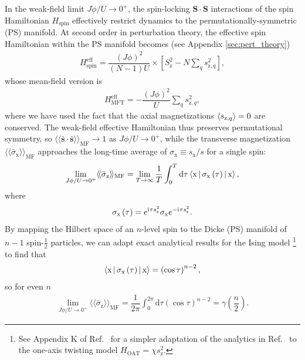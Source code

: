 \documentclass[nofootinbib,twocolumn]{revtex4-2}
\renewcommand{\t}{\text} %
\newcommand{\f}[2]{\dfrac{#1}{#2}} %
\newcommand{\p}[1]{\left(#1\right)} %
\renewcommand{\sp}[1]{\left[#1\right]} %
\newcommand{\bk}{\Braket} %
\renewcommand{\v}{\bm} %
\renewcommand{\c}{\cdot} %
\renewcommand{\dd}{\text{d}} %
\renewcommand{\i}{\mathrm{i}\mkern1mu} %
\newcommand{\bbk}[1]{\langle\!\langle #1 \rangle\!\rangle}
\newcommand{\1}{\mathds{1}}
\newcommand{\x}{\text{x}}
\newcommand{\z}{\text{z}}
\newcommand{\MF}{\text{MF}}
\renewcommand{\ss}{\bar{\v s}\c\bar{\v s}}
\begin{document}
In the weak-field limit $J\phi/U\to0^+$, the spin-locking $\v S\c\v S$ interactions of the spin Hamiltonian $H_{\t{spin}}$ effectively restrict dynamics to the permutationally-symmetric (PS) manifold.
At second order in perturbation theory, the effective spin Hamiltonian within the PS manifold becomes (see Appendix \ref{sec:pert_theory})
\begin{align}
  H_{\t{spin}}^{\t{eff}}
  = \f{\p{J\phi}^2}{\p{N-1}U}
  \times \sp{S_\z^2 - N\sum_q s_{\z,q}^2},
\end{align}
whose mean-field version is
\begin{align}
  H_{\t{MFT}}^{\t{eff}} = -\f{\p{J\phi}^2}{U} \sum_q s_{\z,q}^2,
\end{align}
where we have used the fact that the axial magnetizations $\bk{s_{\z,q}}=0$ are conserved.
The weak-field effective Hamiltonian thus preserves permutational symmetry, so $\bbk{\ss}_\MF\to1$ as $J\phi/U\to0^+$, while the transverse magnetization $\bbk{\bar\sigma_\x}_\MF$ approaches the long-time average of $\sigma_\x\equiv s_\x/s$ for a single spin:
\begin{align}
  \lim_{J\phi/U\to0^+} \bbk{\bar\sigma_\z}_\MF
  = \lim_{T\to\infty} \f1T \int_0^T \dd\tau
  \bk{\x|\sigma_\x\p{\tau}|\x},
\end{align}
where
\begin{align}
  \sigma_\x\p{\tau} = e^{\i\tau s_\z^2} \sigma_\x e^{-\i\tau s_\z^2}.
\end{align}
By mapping the Hilbert space of an $n$-level spin to the Dicke (PS) manifold of $n-1$ spin-$\frac12$ particles, we can adapt exact analytical results for the Ising model \cite{foss-feig2013nonequilibrium}\footnote{See Appendix K of Ref.~\cite{perlin2020shorttime} for a simpler adaptation of the analytics in Ref.~\cite{foss-feig2013nonequilibrium} to the one-axis twisting model $H_{\t{OAT}}=\chi s_\z^2$.} to find that
\begin{align}
  \bk{\x|\sigma_\x\p{\tau}|\x} = \p{\cos\tau}^{n-2},
\end{align}
so for even $n$
\begin{align}
  \lim_{J\phi/U\to0^+} \bbk{\bar\sigma_\z}_\MF
  = \f1{2\pi} \int_0^{2\pi} \dd\tau \p{\cos\tau}^{n-2}
  = \gamma\p{\f{n}{2}}.
\end{align}


\vspace{3cm}



\onecolumngrid
\appendix

\end{document}
